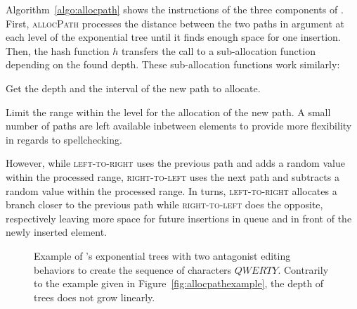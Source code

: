 Algorithm~\ref{algo:allocpath} shows the instructions of the three components of
\LSEQ. First, \textsc{allocPath} processes the distance between the two paths in
argument at each level of the exponential tree until it finds enough space for
one insertion.  Then, the hash function $h$ transfers the call to a
sub-allocation function depending on the found depth. These sub-allocation
functions work similarly:
\begin{inparaenum}[(i)]
\item Get the depth and the interval of the new path to allocate.
\item Limit the range within the level for the allocation of the new path. A
  small number of paths are left available inbetween elements to provide more
  flexibility in regards to spellchecking.
\item However, while \textsc{left-to-right} uses the previous path and adds a
  random value within the processed range, \textsc{right-to-left} uses the next
  path and subtracts a random value within the processed range. In turns,
  \textsc{left-to-right} allocates a branch closer to the previous path while
  \textsc{right-to-left} does the opposite, respectively leaving more space for
  future insertions in queue and in front of the newly inserted element.
\end{inparaenum}

\begin{figure}
  \centering
  \caption{\label{fig:lseqtreeexample} Example of \LSEQ's exponential trees with
    two antagonist editing behaviors to create the sequence of characters
    $QWERTY$. Contrarily to the example given in
    Figure~\ref{fig:allocpathexample}, the depth of trees does not grow linearly.}
\end{figure}



